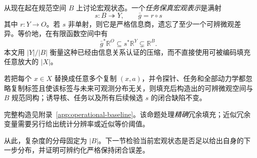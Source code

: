 从现在起在规范空间 $B$ 上讨论宏观状态。一个\emph{任务保真宏观表示}是满射
\[
s:B\twoheadrightarrow Y,
\qquad
\bar g=r\circ s
\]
其中 $r:Y\to O$。若 $s$ 非单射，则它是严格信息商，遗忘了至少一个可辨微观差异。等价地，在有限函数空间中有
\[
\bar g^{*}\mathbb R^O
\subseteq
s^{*}\mathbb R^Y
\subsetneq
\mathbb R^B.
\]
本文用 $|Y|/|B|$ 衡量这种已经由信息关系认证的压缩，而不直接使用可被编码填充任意放大的 $|X|$。

\begin{proposition}[严格复制填充不变性]
\label{prop:padding}
若把每个 $x\in X$ 替换成任意多个复制 $(x,a)$，并令探针、任务和全部动力学都忽略复制标签且使该标签与未来可观测分布无关，则填充后构造出的可辨微观空间与 $B$ 规范同构；诱导核、任务以及所有后续候选 $s$ 的闭合缺陷不变。
\end{proposition}

完整构造见附录~\ref{app:operational-baseline}。该命题处理\emph{精确}冗余填充；近似冗余变量需要另行给出统计分辨率或近似等价阈值。

从此，复杂度的分母固定为 $|B|$。下一节检验当前宏观状态是否足以给出自身的下一步分布，并证明可辨约化严格保持闭合误差。
